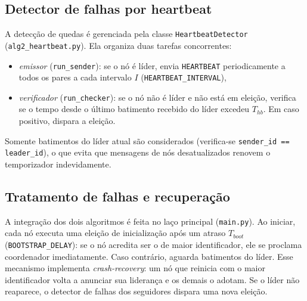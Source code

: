 \documentclass[journal]{IEEEtran}
\begin{document}
\subsection{Detector de falhas por heartbeat}
A detecção de quedas é gerenciada pela classe \texttt{HeartbeatDetector} (\texttt{alg2\_heartbeat.py}). Ela organiza duas tarefas concorrentes:
\begin{itemize}
    \item \emph{emissor} (\texttt{run\_sender}): se o nó é líder, envia \texttt{HEARTBEAT} periodicamente a todos os pares a cada intervalo $I$ (\texttt{HEARTBEAT\_INTERVAL}),
    \item \emph{verificador} (\texttt{run\_checker}): se o nó não é líder e não está em eleição, verifica se o tempo desde o último batimento recebido do líder excedeu $T_{hb}$. Em caso positivo, dispara a eleição.
\end{itemize}
Somente batimentos do líder atual são considerados (verifica-se \texttt{sender\_id == leader\_id}), o que evita que mensagens de nós desatualizados renovem o temporizador indevidamente.

\subsection{Tratamento de falhas e recuperação}
A integração dos dois algoritmos é feita no laço principal (\texttt{main.py}). Ao iniciar, cada nó executa uma eleição de inicialização após um atraso $T_{boot}$ (\texttt{BOOTSTRAP\_DELAY}): se o nó acredita ser o de maior identificador, ele se proclama coordenador imediatamente. Caso contrário, aguarda batimentos do líder. Esse mecanismo implementa \emph{crash-recovery}: um nó que reinicia com o maior identificador volta a anunciar sua liderança e os demais o adotam. Se o líder não reaparece, o detector de falhas dos seguidores dispara uma nova eleição.
\end{document}
